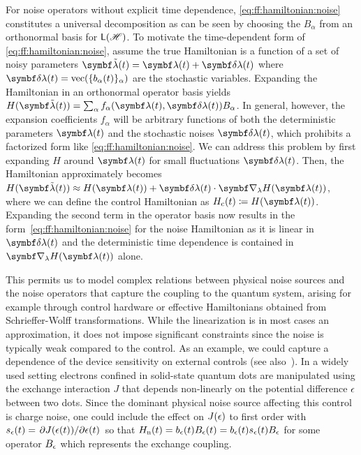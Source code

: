 For noise operators without explicit time dependence, \cref{eq:ff:hamiltonian:noise} constitutes a universal decomposition as can be seen by choosing the $B_\alpha$ from an orthonormal basis for $\mathsf{L}(\mathscr{H})$.
To motivate the time-dependent form of \cref{eq:ff:hamiltonian:noise}, assume the true Hamiltonian is a function of a set of noisy parameters $\bvec{\tilde{\lambda}}(t) = \bvec{\lambda}(t) + \bvec{\delta\lambda}(t)$ where $\bvec{\delta\lambda}(t) = \text{vec}(\{b_\alpha(t)\}_\alpha)$ are the stochastic variables.
Expanding the Hamiltonian in an orthonormal operator basis yields $H(\bvec{\tilde{\lambda}}(t)) = \sum_\alpha f_\alpha(\bvec{\lambda}(t), \bvec{\delta\lambda}(t)) B_\alpha$.
In general, however, the expansion coefficients $f_\alpha$ will be arbitrary functions of both the deterministic parameters $\bvec{\lambda}(t)$ and the stochastic noises $\bvec{\delta\lambda}(t)$, which prohibits a factorized form like \cref{eq:ff:hamiltonian:noise}.
We can address this problem by first expanding $H$ around $\bvec{\lambda}(t)$ for small fluctuations $\bvec{\delta\lambda}(t)$.
Then, the Hamiltonian approximately becomes $H(\bvec{\tilde{\lambda}}(t)) \approx H(\bvec{\lambda}(t)) + \bvec{\delta\lambda}(t)\cdot\bvec{\nabla}_{\lambda} H(\bvec{\lambda}(t))$, where we can define the control Hamiltonian as $\Hc(t)\coloneqq H(\bvec{\lambda}(t))$.
Expanding the second term in the operator basis now results in the form~\eqref{eq:ff:hamiltonian:noise} for the noise Hamiltonian as it is linear in $\bvec{\delta\lambda}(t)$ and the deterministic time dependence is contained in $\bvec{\nabla}_{\lambda} H(\bvec{\lambda}(t))$ alone.

This permits us to model complex relations between physical noise sources and the noise operators that capture the coupling to the quantum system, arising for example through control hardware or effective Hamiltonians obtained from \eg Schrieffer-Wolff transformations.
While the linearization is in most cases an approximation, it does not impose significant constraints since the noise is typically weak compared to the control.
As an example, we could capture a dependence of the device sensitivity on external controls (see also~).
In a widely used setting electrons confined in solid-state quantum dots are manipulated using the exchange interaction $J$ that depends non-linearly on the potential difference $\epsilon$ between two dots.
Since the dominant physical noise source affecting this control is charge noise, one could include the effect on $J(\epsilon)$ to first order with $s_\epsilon(t)=\pdv*{J(\epsilon(t))}{\epsilon(t)}$ so that $H_{\mathrm{n}}(t) = b_\epsilon(t) B_\epsilon(t)  =  b_\epsilon(t) s_\epsilon(t) B_\epsilon$ for some operator $B_\epsilon$ which represents the exchange coupling.

